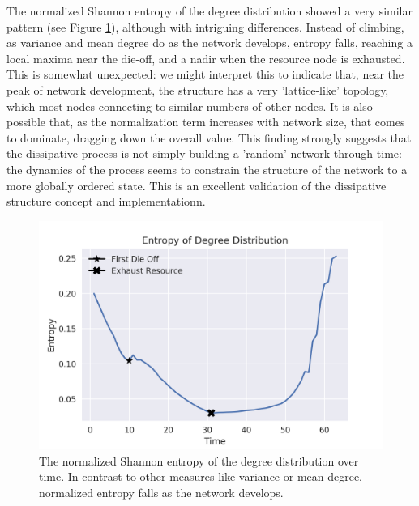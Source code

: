 \documentclass{paper}
\begin{document}
	The normalized Shannon entropy of the degree distribution showed a very similar pattern (see Figure \ref{entropy}), although with intriguing differences. Instead of climbing, as variance and mean degree do as the network develops, entropy falls, reaching a local maxima near the die-off, and a nadir when the resource node is exhausted. This is somewhat unexpected: we might interpret this to indicate that, near the peak of network development, the structure has a very 'lattice-like' topology, which most nodes connecting to similar numbers of other nodes. It is also possible that, as the normalization term increases with network size, that comes to dominate, dragging down the overall value. This finding strongly suggests that the dissipative process is not simply building a 'random' network through time: the dynamics of the process seems to constrain the structure of the network to a more globally ordered state. This is an excellent validation of the dissipative structure concept and implementationn. 
	
	\begin{figure}[h]
		\centering
		\includegraphics[scale=0.75]{entropy_degree.png}
		\caption{The normalized Shannon entropy of the degree distribution over time. In contrast to other measures like variance or mean degree, normalized entropy falls as the network develops. }
		\label{entropy}
	\end{figure}
	
\end{document}
